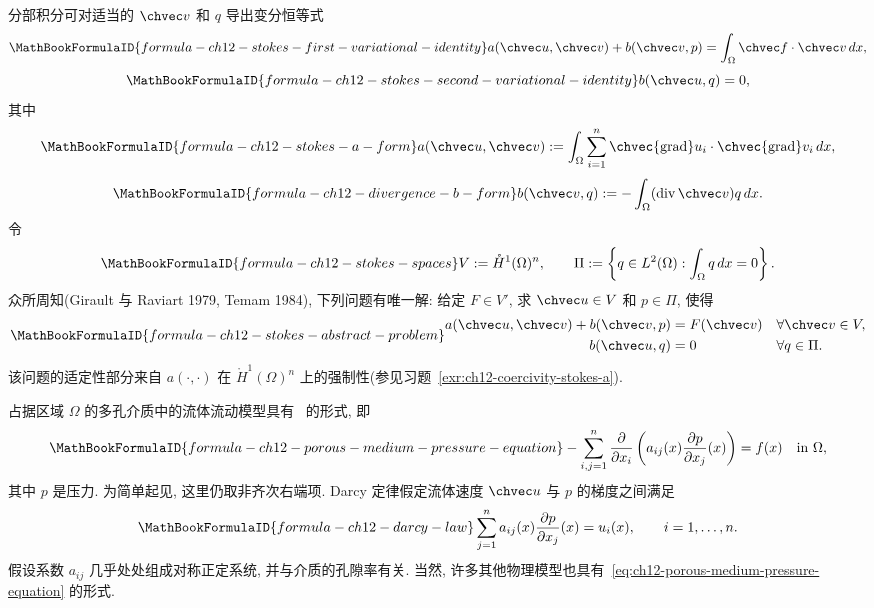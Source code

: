 分部积分可对适当的 $\chvec v$ 和 $q$ 导出变分恒等式
\begin{equation}
\MathBookFormulaID{formula-ch12-stokes-first-variational-identity}
\label{eq:ch12-stokes-first-variational-identity}
a(\chvec u,\chvec v)+b(\chvec v,p)
=\int_\Omega\chvec f\cdot\chvec v\,dx,
\end{equation}
\begin{equation}
\MathBookFormulaID{formula-ch12-stokes-second-variational-identity}
\label{eq:ch12-stokes-second-variational-identity}
b(\chvec u,q)=0,
\end{equation}
其中
\begin{equation}
\MathBookFormulaID{formula-ch12-stokes-a-form}
\label{eq:ch12-stokes-a-form}
a(\chvec u,\chvec v):=
\int_\Omega\sum_{i=1}^n
\chvec{\operatorname{grad}}u_i\cdot
\chvec{\operatorname{grad}}v_i\,dx,
\end{equation}
\begin{equation}
\MathBookFormulaID{formula-ch12-divergence-b-form}
\label{eq:ch12-divergence-b-form}
b(\chvec v,q):=-\int_\Omega(\operatorname{div}\chvec v)q\,dx.
\end{equation}
令
\[
\MathBookFormulaID{formula-ch12-stokes-spaces}
V:=\mathring H^1(\Omega)^n,
\qquad
\Pi:=\left\{q\in L^2(\Omega):\int_\Omega q\,dx=0\right\}.
\]
众所周知(Girault 与 Raviart 1979, Temam 1984), 下列问题有唯一解: 给定 $F\in V'$, 求 $\chvec u\in V$ 和 $p\in\Pi$, 使得
\begin{equation}
\MathBookFormulaID{formula-ch12-stokes-abstract-problem}
\label{eq:ch12-stokes-abstract-problem}
\begin{aligned}
a(\chvec u,\chvec v)+b(\chvec v,p)&=F(\chvec v)&&\forall\chvec v\in V,\\
b(\chvec u,q)&=0&&\forall q\in\Pi.
\end{aligned}
\end{equation}
该问题的适定性部分来自 $a(\cdot,\cdot)$ 在 $\mathring H^1(\Omega)^n$ 上的强制性(参见习题~\ref{exr:ch12-coercivity-stokes-a}).

占据区域 $\Omega$ 的多孔介质中的流体流动模型具有~ 的形式, 即
\begin{equation}
\MathBookFormulaID{formula-ch12-porous-medium-pressure-equation}
\label{eq:ch12-porous-medium-pressure-equation}
-\sum_{i,j=1}^n\frac{\partial}{\partial x_i}
\left(a_{ij}(x)\frac{\partial p}{\partial x_j}(x)\right)
=f(x)\quad\text{in }\Omega,
\end{equation}
其中 $p$ 是压力. 为简单起见, 这里仍取非齐次右端项. Darcy 定律假定流体速度 $\chvec u$ 与 $p$ 的梯度之间满足
\[
\MathBookFormulaID{formula-ch12-darcy-law}
\sum_{j=1}^n a_{ij}(x)\frac{\partial p}{\partial x_j}(x)
=u_i(x),\qquad i=1,\ldots,n.
\]
假设系数 $a_{ij}$ 几乎处处组成对称正定系统, 并与介质的孔隙率有关. 当然, 许多其他物理模型也具有~\eqref{eq:ch12-porous-medium-pressure-equation} 的形式.

